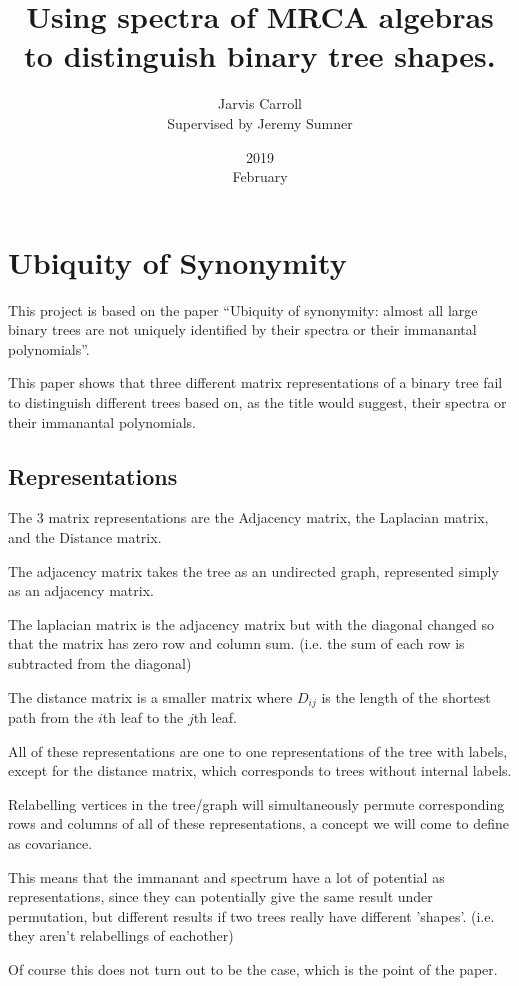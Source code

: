 \documentclass[10pt,a4paper]{report}
\title{Using spectra of MRCA algebras to distinguish binary tree shapes.}
\date{2019\\ February}
\author{Jarvis Carroll
\\ Supervised by Jeremy Sumner}
\begin{document}
\maketitle

\chapter{Ubiquity of Synonymity}

This project is based on the paper ``Ubiquity of synonymity: almost all large
binary trees are not uniquely identified by their spectra or their immanantal
polynomials''.

This paper shows that three different matrix representations of a binary tree
fail to distinguish different trees based on, as the title would suggest, their
spectra or their immanantal polynomials.

\section{Representations}

The 3 matrix representations are the Adjacency matrix, the Laplacian matrix,
and the Distance matrix.

The adjacency matrix takes the tree as an undirected graph, represented simply
as an adjacency matrix.

The laplacian matrix is the adjacency matrix but with the diagonal changed so
that the matrix has zero row and column sum. (i.e. the sum of each row is subtracted from the diagonal)

The distance matrix is a smaller matrix where $D_{ij}$ is the length of the
shortest path from the $i$th leaf to the $j$th leaf.

All of these representations are one to one representations of the tree with labels, except
for the distance matrix, which corresponds to trees without internal labels.

Relabelling vertices in the tree/graph will simultaneously permute
corresponding rows and columns of all of these representations, a concept we will come to define as covariance.

This means that the immanant and spectrum have a lot of potential as
representations, since they can potentially give the same result under
permutation, but different results if two trees really have different 'shapes'. (i.e. they aren't relabellings of eachother)

Of course this does not turn out to be the case, which is the point of the
paper.
\end{document}
